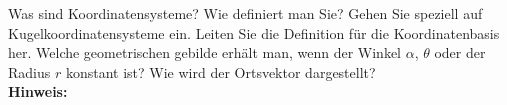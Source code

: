 \begin{question}[section=1,subsection=12,name={Koordinatensysteme},difficulty=,type=mdl,mode=exm,tags={}]
	Was sind Koordinatensysteme? Wie definiert man Sie? Gehen Sie speziell auf Kugelkoordinatensysteme ein. Leiten Sie die Definition für die Koordinatenbasis her. Welche geometrischen gebilde erhält man, wenn der Winkel $\alpha$, $\theta$ oder der Radius $r$ konstant ist? Wie wird der Ortsvektor dargestellt? 
	\\ \textbf{Hinweis:}\\
	
\end{question}
\begin{solution}
	
\end{solution}